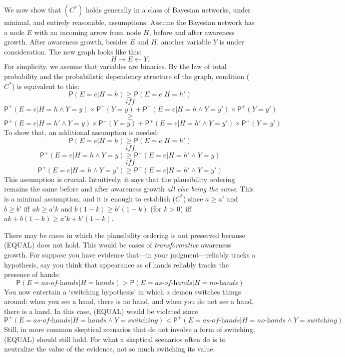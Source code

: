 \documentclass[
  11pt,
  dvipsnames,enabledeprecatedfontcommands]{scrartcl}
\newcommand{\pr}[1]{\ensuremath{\mathsf{P}(#1)}}
\newcommand{\ppr}[2]{\ensuremath{\mathsf{P}^{#1}(#2)}}
\begin{document}
We now show that \((C^*)\) holds generally in a class of Bayesian
networks, under minimal, and entirely reasonable, assumptions. Assume
the Bayesian network has a node \(E\) with an incoming arrow from node
\(H\), before and after awareness growth. After awareness growth,
besides \(E\) and \(H\), another variable \(Y\) is under consideration.
The new graph looks like this: \[H\rightarrow E \leftarrow Y.\] For
simplicity, we assume that variables are binaries. By the law of total
probability and the probabilistic dependency structure of the graph,
condition (\(C^*\)) is equivalent to this:
\[\pr{E=e \vert H=h} \geq \pr{E=e \vert H=h'}\] \[\textit{ iff }\]
\[\ppr{+}{E=e \vert H=h \wedge Y=y}\times \ppr{+}{Y=y} + \ppr{+}{E=e \vert H=h \wedge Y=y'}\times \ppr{+}{Y=y'} \]
\[\geq\]
\[\ppr{+}{E=e \vert H=h' \wedge Y=y}\times \ppr{+}{Y=y} + \ppr{+}{E=e \vert H=h' \wedge Y=y'}\times \ppr{+}{Y=y'} \]
To show that, an additional assumption is needed:
\[\pr{E=e \vert H=h} \geq \pr{E=e \vert H=h'} \] \[\textit{ iff }\]
\[\ppr{+}{E=e \vert H=h \wedge Y=y} \geq \ppr{+}{E=e \vert H=h' \wedge Y=y} \tag{EQUAL}\]
\[\textit{ iff }\]
\[\ppr{+}{E=e \vert H=h \wedge Y=y'} \geq \ppr{+}{E=e \vert H=h' \wedge Y=y'}\]
This assumption is crucial. Intuitively, it says that the plausibility
ordering remains the same before and after awareness growth
\textit{all else being the same}. This is a minimal assumption, and it
is enough to establish (\(C^*\)) since \(a \geq a'\) and \(b\geq b'\)
iff \(ak \geq a'k\) and \(b(1-k)\geq b'(1-k)\) (for \(k>0\)) iff
\(ak+b(1-k) \geq a'k+b'(1-k)\).

There may be cases in which the plausibility ordering is not preserved
because (EQUAL) does not hold. This would be cases of
\textit{transformative} awareness growth. For suppose you have evidence
that---in your judgment---reliably tracks a hypothesis, say you think
that appearance as of hands reliably tracks the presence of hands:
\[\pr{E=\textit{as-of-hands} \vert H=\textit{hands}} > \pr{E=\textit{as-of-hands} \vert H=\textit{no-hands}} \]
You now entertain a `switching hypothesis' in which a demon switches
things around: when you see a hand, there is no hand, and when you do
not see a hand, there is a hand. In this case, (EQUAL) would be violated
since
\[\ppr{+}{E=\textit{as-of-hands} \vert H=\textit{hands} \wedge Y=\textit{switching}} < \ppr{+}{E=\textit{as-of-hands} \vert H=\textit{no-hands} \wedge Y=\textit{switching}}\]
Still, in more common skeptical scenarios that do not involve a form of
switching, (EQUAL) should still hold. For what a skeptical scenarios
often do is to neutralize the value of the evidence, not so much
switching its value.
\end{document}
